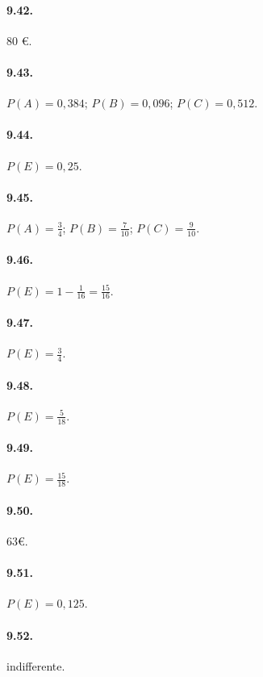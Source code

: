 \begin{multicols}{2}
\paragraph{9.42.} 80 €.

\paragraph{9.43.} $P(A)=0,384$; $P(B)=0,096$; $P(C)=0,512$.

\paragraph{9.44.} $P(E)=0,25$.

\paragraph{9.45.} $P(A)=\frac 3 4$; $P(B)=\frac 7{10}$; $P(C)=\frac 9{10}$.

\paragraph{9.46.} $P(E)=1-\frac 1{16}=\frac{15}{16}$.

\paragraph{9.47.} $P(E)=\frac 3 4$.

\paragraph{9.48.} $P(E)=\frac 5{18}$.

\paragraph{9.49.} $P(E)=\frac{15}{18}$.

\paragraph{9.50.} $63\text{€}$.

\paragraph{9.51.} $P(E)=0,125$.

\paragraph{9.52.} indifferente.


\end{multicols}
